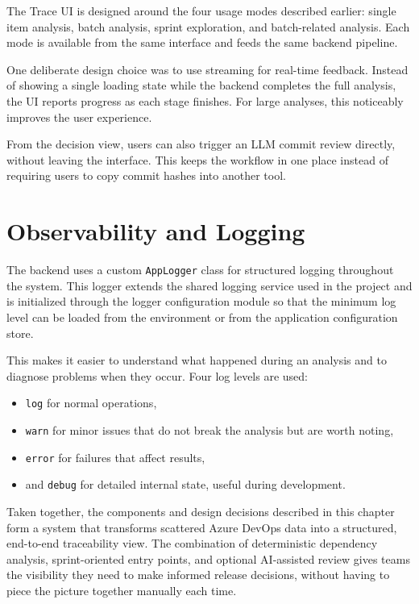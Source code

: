 The Trace UI is designed around the four usage modes described earlier: single item analysis, batch analysis, sprint exploration, and batch-related analysis. Each mode is available from the same interface and feeds the same backend pipeline.

One deliberate design choice was to use streaming for real-time feedback. Instead of showing a single loading state while the backend completes the full analysis, the UI reports progress as each stage finishes. For large analyses, this noticeably improves the user experience.

From the decision view, users can also trigger an LLM commit review directly, without leaving the interface. This keeps the workflow in one place instead of requiring users to copy commit hashes into another tool.

\section{Observability and Logging}

The backend uses a custom \texttt{AppLogger} class for structured logging throughout the system. This logger extends the shared logging service used in the project and is initialized through the logger configuration module so that the minimum log level can be loaded from the environment or from the application configuration store.

This makes it easier to understand what happened during an analysis and to diagnose problems when they occur. Four log levels are used:

\begin{itemize}
    \item \texttt{log} for normal operations,
    \item \texttt{warn} for minor issues that do not break the analysis but are worth noting,
    \item \texttt{error} for failures that affect results,
    \item and \texttt{debug} for detailed internal state, useful during development.
\end{itemize}

\bigskip

Taken together, the components and design decisions described in this chapter form a system that transforms scattered Azure DevOps data into a structured, end-to-end traceability view. The combination of deterministic dependency analysis, sprint-oriented entry points, and optional AI-assisted review gives teams the visibility they need to make informed release decisions, without having to piece the picture together manually each time.